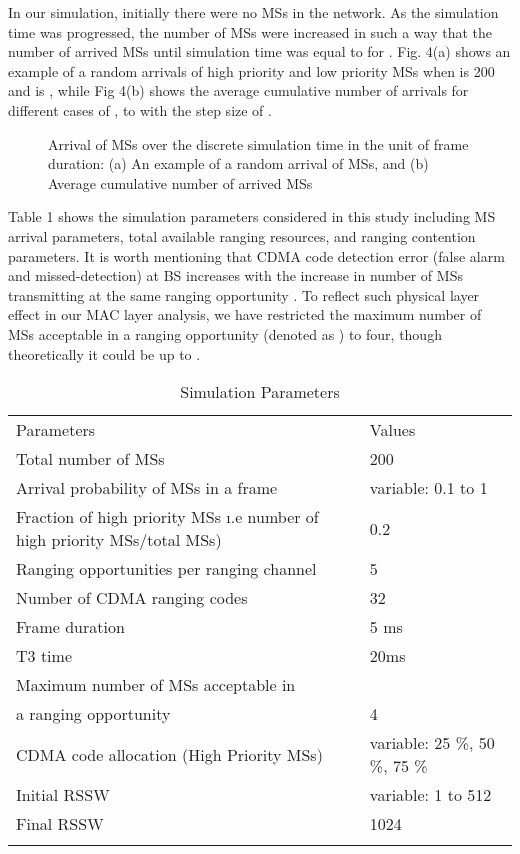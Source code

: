 \documentclass[preprint,12pt]{elsarticle}
\begin{document}
In our simulation, initially there were no MSs in the network. As the simulation time   was progressed, the number of MSs were increased in such a way that the number of arrived MSs  until simulation time   was equal to  for . Fig. 4(a) shows an example of a random arrivals of high priority and low priority MSs when   is 200 and   is , while Fig 4(b) shows the average cumulative number of arrivals for  different cases of ,  to  with the step size of .


\begin{figure}[h]
\centering
{}
\caption{Arrival of MSs over the discrete simulation time in the unit of frame duration: (a) An example of a random arrival of MSs, and (b) Average cumulative number of arrived MSs}
\end{figure}


Table 1 shows the simulation parameters considered in this study including MS arrival parameters, total available ranging resources, and ranging contention parameters. It is worth mentioning that CDMA code detection error (false alarm and missed-detection) at BS increases with the increase in number of MSs transmitting at the same ranging opportunity \cite{Minn}. To reflect such physical layer effect in our MAC layer analysis, we have restricted the maximum number of MSs acceptable in a ranging opportunity (denoted as ) to four, though theoretically it could be up to .


\begin{table}
\caption{Simulation Parameters}
\label{Tab1}
\begin{tabular}{ll}
\hline\noalign{\smallskip}
Parameters  &  Values   \\
\noalign{\smallskip}\hline\noalign{\smallskip}
Total number of MSs & 200\\
Arrival probability of MSs in a frame & variable: 0.1  to 1\\
Fraction of high priority MSs \i.e number of high priority MSs/total MSs) & 0.2 \\
Ranging opportunities per ranging channel    & 5 \\
Number of CDMA ranging codes & 32\\
Frame duration & 5 ms \\
T3 time & 20ms\\
Maximum number of MSs acceptable in\\ a ranging opportunity  & 4 \\
CDMA code allocation (High Priority MSs) & variable: 25 \%, 50 \%, 75 \% \\
Initial RSSW & variable: 1 to 512 \\
Final RSSW & 1024 \\
\noalign{\smallskip}\hline
\end{tabular}
\end{table}
\end{document}
